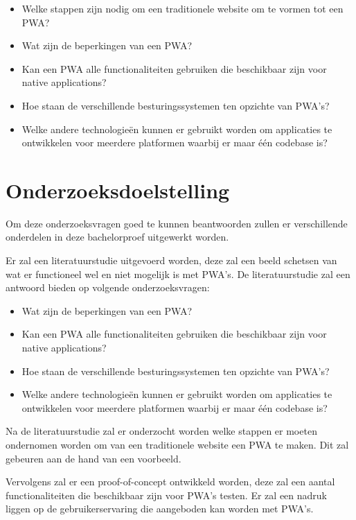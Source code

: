	\begin{itemize}
		  \item Welke stappen zijn nodig om een traditionele website om te vormen tot een PWA?
		  \item Wat zijn de beperkingen van een PWA?
		  \item Kan een PWA alle functionaliteiten gebruiken die beschikbaar zijn voor native applications?
		  \item Hoe staan de verschillende besturingssystemen ten opzichte van PWA's?
		  \item Welke andere technologieën kunnen er gebruikt worden om applicaties te ontwikkelen voor meerdere platformen waarbij er maar één codebase is?
	  \end{itemize}

\section{Onderzoeksdoelstelling}
	
	Om deze onderzoeksvragen goed te kunnen beantwoorden zullen er verschillende onderdelen in deze bachelorproef uitgewerkt worden.
	
	Er zal een literatuurstudie uitgevoerd worden, deze zal een beeld schetsen van wat er functioneel wel en niet mogelijk is met PWA's. 
	De literatuurstudie zal een antwoord bieden op volgende onderzoeksvragen:
	\begin{itemize}
		  \item Wat zijn de beperkingen van een PWA?
		  \item Kan een PWA alle functionaliteiten gebruiken die beschikbaar zijn voor native applications?
		  \item Hoe staan de verschillende besturingssystemen ten opzichte van PWA's?
		  \item Welke andere technologieën kunnen er gebruikt worden om applicaties te ontwikkelen voor meerdere platformen waarbij er maar één codebase is?
	  \end{itemize}	
	  
	Na de literatuurstudie zal er onderzocht worden welke stappen er moeten ondernomen worden om van een traditionele website een PWA te maken. Dit zal gebeuren aan de hand van een voorbeeld.
	
	Vervolgens zal er een proof-of-concept ontwikkeld worden, deze zal een aantal functionaliteiten die beschikbaar zijn voor PWA's testen. Er zal een nadruk liggen op de gebruikerservaring die aangeboden kan worden met PWA's.
	

